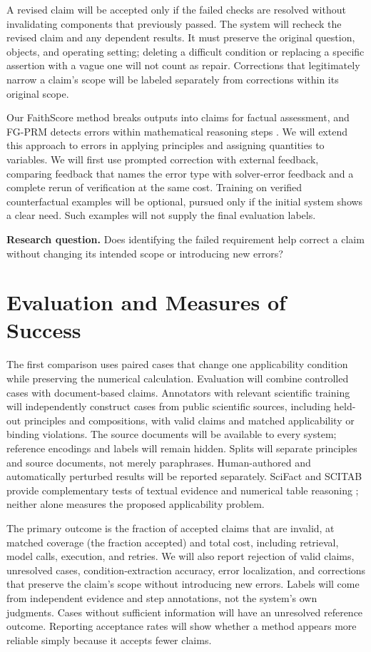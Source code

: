\documentclass[12pt]{article}
\begin{document}
A revised claim will be accepted only if the failed checks are resolved without invalidating components that previously passed. The system will recheck the revised claim and any dependent results. It must preserve the original question, objects, and operating setting; deleting a difficult condition or replacing a specific assertion with a vague one will not count as repair. Corrections that legitimately narrow a claim's scope will be labeled separately from corrections within its original scope.

Our FaithScore method breaks outputs into claims for factual assessment, and FG-PRM detects errors within mathematical reasoning steps \citep{jing2024faithscore,li2025fgprm}. We will extend this approach to errors in applying principles and assigning quantities to variables. We will first use prompted correction with external feedback, comparing feedback that names the error type with solver-error feedback and a complete rerun of verification at the same cost. Training on verified counterfactual examples will be optional, pursued only if the initial system shows a clear need. Such examples will not supply the final evaluation labels.

\textbf{Research question.} Does identifying the failed requirement help correct a claim without changing its intended scope or introducing new errors?

\section*{Evaluation and Measures of Success}

The first comparison uses paired cases that change one applicability condition while preserving the numerical calculation. Evaluation will combine controlled cases with document-based claims. Annotators with relevant scientific training will independently construct cases from public scientific sources, including held-out principles and compositions, with valid claims and matched applicability or binding violations. The source documents will be available to every system; reference encodings and labels will remain hidden. Splits will separate principles and source documents, not merely paraphrases. Human-authored and automatically perturbed results will be reported separately. SciFact and SCITAB provide complementary tests of textual evidence and numerical table reasoning \citep{wadden2020scifact,lu2023scitab}; neither alone measures the proposed applicability problem.

The primary outcome is the fraction of accepted claims that are invalid, at matched coverage (the fraction accepted) and total cost, including retrieval, model calls, execution, and retries. We will also report rejection of valid claims, unresolved cases, condition-extraction accuracy, error localization, and corrections that preserve the claim's scope without introducing new errors. Labels will come from independent evidence and step annotations, not the system's own judgments. Cases without sufficient information will have an unresolved reference outcome. Reporting acceptance rates will show whether a method appears more reliable simply because it accepts fewer claims.
\end{document}
